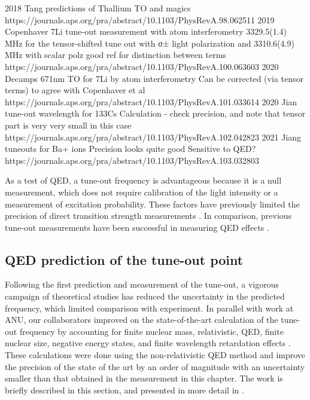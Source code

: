 	2018 Tang predictions of Thallium TO and magics
		https://journals.aps.org/pra/abstract/10.1103/PhysRevA.98.062511
	2019 Copenhaver 7Li tune-out measurement with atom interferometry
		 3329.5(1.4) MHz for the tensor-shifted tune out  with σ± light polarization and 3310.6(4.9) MHz with scalar polz
		 good ref for distinction between terms
		https://journals.aps.org/pra/abstract/10.1103/PhysRevA.100.063603
	2020 Decamps 671nm TO for 7Li by atom interferometry
		Can be corrected (via tensor terms) to agree with Copenhaver et al
		https://journals.aps.org/pra/abstract/10.1103/PhysRevA.101.033614
	2020 Jian tune-out wavelength for 133Cs
		Calculation - check precision, and note that tensor part is very very small in this case
		https://journals.aps.org/pra/abstract/10.1103/PhysRevA.102.042823
	2021 Jiang tuneouts for Ba+ ions
		Precision looks quite good
		Sensitive to QED?
		https://journals.aps.org/pra/abstract/10.1103/PhysRevA.103.032803


	
	
	As a test of QED, a tune-out frequency is advantageous because it is a null measurement, which does not require calibration of the light intensity or a measurement of excitation probability. These factors have previously limited the precision of direct transition strength measurements \cite{Boloufa09,Vogt07,Thomas20}. In comparison, previous tune-out measurements have been successful in measuring QED effects \cite{Leonard15,Holmgren12,Schmidt16,Herold12,Henson15}.



\subsection{QED prediction of the tune-out point}
	Following the first prediction \cite{Mitroy13} and measurement \cite{Henson15} of the tune-out, a vigorous campaign of theoretical studies \cite{Zhang16,ManaloThesis,Drake19,Zhang19, Pachucki19} has reduced the uncertainty in the predicted frequency, which limited comparison with experiment. In parallel with work at ANU, our collaborators improved on the state-of-the-art calculation \cite{Zhang19} of the tune-out frequency by accounting for finite nuclear mass, relativistic, QED, finite nuclear size, negative energy states, and finite wavelength retardation effects \cite{Drake19, Pachucki19,ArxivTO}. These calculations were done using the non-relativistic QED method and improve the precision of the state of the art by an order of magnitude with an uncertainty smaller than that obtained in the measurement in this chapter. The work is briefly described in this section, and presented in more detail in \cite{ArxivTO}.


